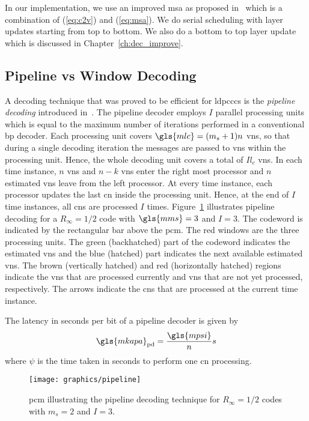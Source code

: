 In our implementation, we use an improved \gls{msa} as proposed in~\cite{Jones2003} which is a combination of (\ref{eq:c2v}) and (\ref{eq:msa}). We do serial scheduling with layer updates starting from top to bottom. We also do a bottom to top layer update which is discussed in Chapter~\ref{ch:dec_improve}.

\subsection{Pipeline vs Window Decoding}\label{sec:back_wd}
A decoding technique that was proved to be efficient for \glspl{ldpccc} is the \emph{pipeline decoding} introduced in~\cite{Felstrom1999}. The pipeline decoder employs $I$ parallel processing units which is equal to the maximum number of iterations performed in a conventional \gls{bp} decoder. Each processing unit covers $\gls{mlc}=(m_s+1)n$ \glspl{vn}, so that during a single decoding iteration the messages are passed to \glspl{vn} within the processing unit. Hence, the whole decoding unit covers a total of $Il_c$ \glspl{vn}. In each time instance, $n$ \glspl{vn} and $n-k$ \glspl{vn} enter the right most processor and $n$ estimated \glspl{vn} leave from the left processor. At every time instance, each processor updates the last \gls{cn} inside the processing unit. Hence, at the end of $I$ time instances, all \glspl{cn} are processed $I$ times. Figure~\ref{fig:pipeline} illustrates pipeline decoding for a $R_\infty=1/2$ code with $\gls{mms}=3$ and $I=3$. The codeword is indicated by the rectangular bar above the \gls{pcm}. The red windows are the three processing units. The green (backhatched) part of the codeword indicates the estimated \glspl{vn} and the blue (hatched) part indicates the next available estimated \glspl{vn}. The brown (vertically hatched) and red (horizontally hatched) regions indicate the \glspl{vn} that are processed currently and \glspl{vn} that are not yet processed, respectively. The arrows indicate the \glspl{cn} that are processed at the current time instance.

The latency in seconds per bit of a pipeline decoder is given by
\begin{align}
\gls{mkapa}_{\text{pd}}=\frac{\gls{mpsi}}{n}s
\end{align}
where $\psi$ is the time taken in seconds to perform one \gls{cn} processing.

\begin{figure}[htbp]
  \centering
  \texttt{[image: graphics/pipeline]}
  \caption{\gls{pcm} illustrating the pipeline decoding technique for $R_\infty=1/2$ codes with $m_s=2$ and $I=3$.}
  \label{fig:pipeline}
\end{figure}

